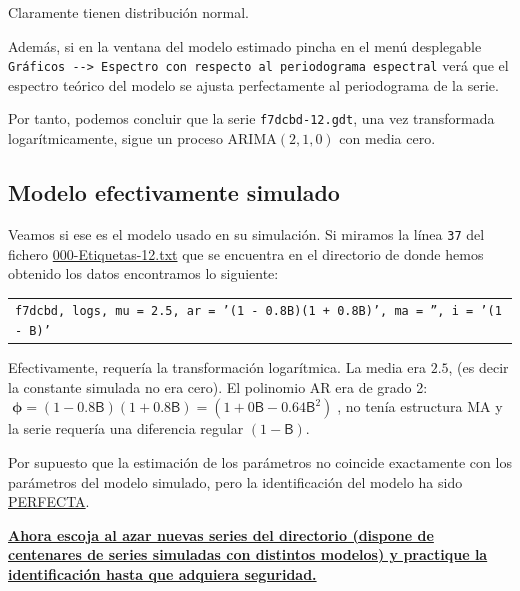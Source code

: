 \documentclass[10pt]{article}
\begin{document}
Claramente tienen distribución normal.
\medskip


Además, si en la ventana del modelo estimado pincha en el menú
desplegable \texttt{Gráficos -{}-{}> Espectro con respecto al periodograma
espectral} verá que el espectro teórico del modelo se ajusta
perfectamente al periodograma de la serie.
\medskip

Por tanto, podemos concluir que la serie \texttt{f7dcbd-12.gdt}, una vez
transformada logarítmicamente, sigue un proceso ARIMA\((2,1,0)\) con
media cero. 
\subsection*{Modelo efectivamente simulado}
\label{sec:org74471f6}

Veamos si ese es el modelo usado en su simulación. Si miramos la línea
\texttt{37} del fichero \href{IdentificaEstosARIMA/000-Etiquetas-12.txt}{000-Etiquetas-12.txt} que se encuentra en el directorio de
donde hemos obtenido los datos encontramos lo siguiente:
\medskip

\begin{center}
\begin{tabular}{l}
\texttt{f7dcbd,	logs,	mu = 2.5,	ar = '(1 - 0.8B)(1 + 0.8B)', ma = '', i = '(1 - B)'}\\
\end{tabular}
\end{center}

\medskip

Efectivamente, requería la transformación logarítmica. La media era
\(2.5\), (es decir la constante simulada no era cero). El polinomio AR
era de grado 2: \(\;\boldsymbol{\phi}=(1 - 0.8\mathsf{B})(1 +
0.8\mathsf{B})=(1+0\mathsf{B}-0.64\mathsf{B}^2)\;\), no tenía
estructura MA y la serie requería una diferencia regular \((1 -
\mathsf{B})\).
\bigskip

Por supuesto que la estimación de los parámetros no coincide
exactamente con los parámetros del modelo simulado, pero la
identificación del modelo ha sido \uline{PERFECTA}.
\bigskip


\textbf{\uline{Ahora escoja al azar nuevas series del \href{https://github.com/mbujosab/EconometriaAplicada-SRC/tree/main/Ejercicios/IdentificaEstosARIMA}{directorio} (dispone de
 centenares de series simuladas con distintos modelos) y practique la
 identificación hasta que adquiera seguridad.}}
\end{document}
